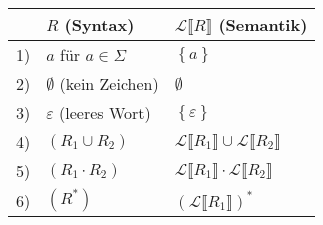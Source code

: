 \documentclass[
	final,
	a4paper,
	oneside,
	parskip=full,
	headings=standardclasses,
	headings=big,
	pointednumbers
]{scrartcl}
\begin{document}
    \renewcommand{\arraystretch}{1.5}
    \begin{tabular}{l|l|l}
        \multicolumn{1}{l}{} &
        \multicolumn{1}{l}{$R$ (Syntax)} &
        \multicolumn{1}{l}{$\mathscr{L} \llbracket R \rrbracket$ (Semantik)} \\
        \hline
        1) & $a$ für $a \in \Sigma$                         & $\left\{ a \right\}$ \\
        2) & $\emptyset$ (kein Zeichen)                     & $\emptyset$ \\
        3) & $\varepsilon$ (leeres Wort)                    & $\left\{ \varepsilon \right\}$ \\
        \hline
        4) & $\left(R_1 \cup R_2\right)$                    & $\mathscr{L} \llbracket R_1 \rrbracket \cup
                                                               \mathscr{L} \llbracket R_2 \rrbracket$ \\
        5) & $\left(R_1 \cdot R_2\right)$                   & $\mathscr{L} \llbracket R_1 \rrbracket \cdot
                                                               \mathscr{L} \llbracket R_2 \rrbracket$ \\
        6) & $\left(R^*\right)$                             & $\left( \mathscr{L} \llbracket R_1
                                                              \rrbracket \right)^*$
    \end{tabular}
    
    

    \newpage
\end{document}
